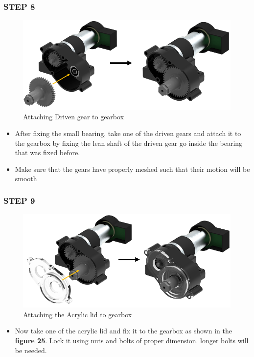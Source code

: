 \documentclass[12pt,a4paper,oneside]{book}
\begin{document}
			\subsubsection*{STEP 8}
				\begin{figure}[H]
					\begin{center}
						\includegraphics[scale=0.6]{ATTACHING DRIVEN GEAR TO GEARBOX}
						\caption{Attaching Driven gear to gearbox}
					\end{center}
				\end{figure}
				\begin{itemize}
					\item After fixing the small bearing, take one of the driven gears and attach it to the gearbox by fixing the lean shaft of the driven gear go inside the bearing that was fixed before. 
					\item Make sure that the gears have properly meshed such that their motion will be smooth
					
				\end{itemize}
			\subsubsection*{STEP 9}
				\begin{figure}[H]
					\begin{center}
						\includegraphics[scale=0.6]{ATTACHING GLASSLID TO GEARBOX}
						\caption{Attaching the Acrylic lid to gearbox}
					\end{center}
				\end{figure}
				\begin{itemize}
					\item Now take one of the acrylic lid and fix it to the gearbox as shown in the \textbf{figure 25}. Lock it using nuts and bolts of proper dimension. longer bolts will be needed. 
				\end{itemize}
				
\end{document}
